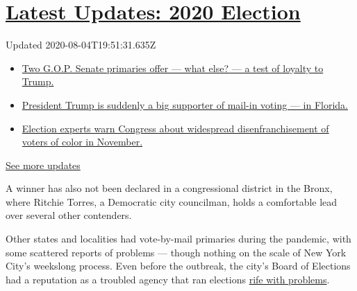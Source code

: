 \hypertarget{latest-updates-2020-election}{%
\section{\texorpdfstring{\href{https://www.nytimes3xbfgragh.onion/2020/08/04/us/elections/primary-election-michigan-arizona-kansas.html?action=click\&pgtype=Article\&state=default\&region=MAIN_CONTENT_1\&context=storylines_live_updates}{Latest
Updates: 2020
Election}}{Latest Updates: 2020 Election}}\label{latest-updates-2020-election}}

Updated 2020-08-04T19:51:31.635Z

\begin{itemize}
\tightlist
\item
  \href{https://www.nytimes3xbfgragh.onion/2020/08/04/us/elections/primary-election-michigan-arizona-kansas.html?action=click\&pgtype=Article\&state=default\&region=MAIN_CONTENT_1\&context=storylines_live_updates\#link-3924dd44}{Two
  G.O.P. Senate primaries offer --- what else? --- a test of loyalty to
  Trump.}
\item
  \href{https://www.nytimes3xbfgragh.onion/2020/08/04/us/elections/primary-election-michigan-arizona-kansas.html?action=click\&pgtype=Article\&state=default\&region=MAIN_CONTENT_1\&context=storylines_live_updates\#link-32b39e33}{President
  Trump is suddenly a big supporter of mail-in voting --- in Florida.}
\item
  \href{https://www.nytimes3xbfgragh.onion/2020/08/04/us/elections/primary-election-michigan-arizona-kansas.html?action=click\&pgtype=Article\&state=default\&region=MAIN_CONTENT_1\&context=storylines_live_updates\#link-6d019753}{Election
  experts warn Congress about widespread disenfranchisement of voters of
  color in November.}
\end{itemize}

\href{https://www.nytimes3xbfgragh.onion/2020/08/04/us/elections/primary-election-michigan-arizona-kansas.html?action=click\&pgtype=Article\&state=default\&region=MAIN_CONTENT_1\&context=storylines_live_updates}{See
more updates}

A winner has also not been declared in a congressional district in the
Bronx, where Ritchie Torres, a Democratic city councilman, holds a
comfortable lead over several other contenders.

Other states and localities had vote-by-mail primaries during the
pandemic, with some scattered reports of problems --- though nothing on
the scale of New York City's weekslong process. Even before the
outbreak, the city's Board of Elections had a reputation as a troubled
agency that ran elections
\href{https://www.nytimes3xbfgragh.onion/2018/11/07/nyregion/voting-problems-nyc-.html}{rife
with problems}.

